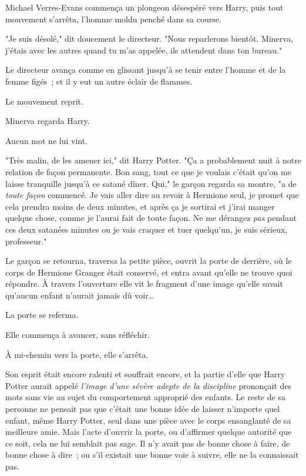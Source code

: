 Michael Verres-Evans commença un plongeon désespéré vers Harry, puis tout mouvement s'arrêta, l'homme moldu penché dans sa course.

"Je suis désolé," dit doucement le directeur. "Nous reparlerons bientôt. Minerva, j'étais avec les autres quand tu m'as appelée, ils attendent dans ton bureau."

Le directeur avança comme en glissant jusqu'à se tenir entre l'homme et de la femme figés~; et il y eut un autre éclair de flammes.

Le mouvement reprit.

Minerva regarda Harry.

Aucun mot ne lui vint.

"Très malin, de les amener ici," dit Harry Potter. "Ça a probablement nuit à notre relation de façon permanente. Bon sang, tout ce que je voulais c'était qu'on me laisse tranquille jusqu'à ce satané dîner. Qui," le garçon regarda sa montre, "a de \emph{toute façon} commencé. Je vais aller dire au revoir à Hermione seul, je promet que cela prendra moins de deux minutes, et après ça je sortirai et j'irai manger quelque chose, comme je l'aurai fait de toute façon. Ne me dérangez \emph{pas} pendant ces deux satanées minutes ou je vais craquer et tuer quelqu'un, je suis sérieux, professeur."

Le garçon se retourna, traversa la petite pièce, ouvrit la porte de derrière, où le corps de Hermione Granger était conservé, et entra avant qu'elle ne trouve quoi répondre. À travers l'ouverture elle vit le fragment d'une image qu'elle savait qu'aucun enfant n'aurait jamais dû voir…

La porte se referma.

Elle commença à avancer, sans réfléchir.

À mi-chemin vers la porte, elle s'arrêta.

Son esprit était encore ralenti et souffrait encore, et la partie d'elle que Harry Potter aurait appelé \emph{l'image d'une sévère adepte de la discipline} prononçait des mots sans vie au sujet du comportement approprié des enfants. Le reste de sa personne ne pensait pas que c'était une bonne idée de laisser n'importe quel enfant, même Harry Potter, seul dans une pièce avec le corps ensanglanté de sa meilleure amie. Mais l'acte d'ouvrir la porte, ou d'affirmer quelque autorité que ce soit, cela ne lui semblait pas sage. Il n'y avait pas de bonne chose à faire, de bonne chose à dire~; ou s'il existait une bonne voie à suivre, elle ne la connaissait pas.

